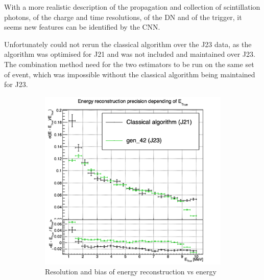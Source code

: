 \documentclass[../main.tex]{subfiles}
\begin{document}
With a more realistic description of the propagation and collection of scintillation photons, of the charge and time resolutions, of the DN and of the trigger, it seems new features can be identified by the CNN.

Unfortunately could not rerun the classical algorithm over the J23 data, as the algorithm was optimised for J21 and was not included and maintained over J23. The combination method need for the two estimators to be run on the same set of event, which was impossible without the classical algorithm being maintained for J23.

\begin{figure}[ht]
  \centering
  \begin{subfigure}[t]{0.32\linewidth}
    \centering
    \includegraphics[width=\linewidth]{images/jcnn/vic_cnn/multi_vic_42_MESBvETC.png}
    \caption{Resolution and bias of energy reconstruction vs energy}
    \label{fig:jcnn:vic_cnn:multi_vic_42_MESBvETC}
  \end{subfigure}
  \begin{subfigure}[t]{0.32\linewidth}
    \centering

\end{subfigure}
\end{figure}
\end{document}
